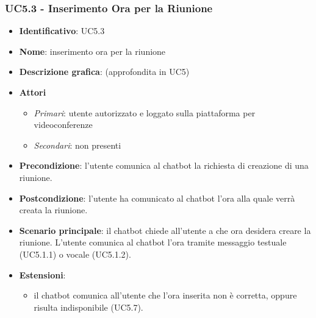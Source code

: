 \subsubsection{UC5.3 - Inserimento Ora per la Riunione}
\begin{itemize}
    \item \textbf{Identificativo}: UC5.3
    \item \textbf{Nome}: inserimento ora per la riunione
    \item \textbf{Descrizione grafica}: (approfondita in UC5)
    \item \textbf{Attori}
 \begin{itemize} 
    \item \textit{Primari}: utente autorizzato e loggato sulla piattaforma per videoconferenze
    \item \textit{Secondari}: non presenti
 \end{itemize}
 \item \textbf{Precondizione}: l'utente comunica al chatbot la richiesta di creazione di una riunione.
 \item \textbf{Postcondizione}: l'utente ha comunicato al chatbot l'ora alla quale verrà creata la riunione.
 \item \textbf{Scenario principale}: il chatbot chiede all'utente a che ora desidera creare la riunione. L'utente comunica al chatbot l'ora tramite messaggio testuale (UC5.1.1) o vocale (UC5.1.2).
 \item \textbf{Estensioni}: 
 \begin{itemize} 
    \item il chatbot comunica all'utente che l'ora inserita non è corretta, oppure risulta indisponibile (UC5.7).
 \end{itemize}
\end{itemize}


